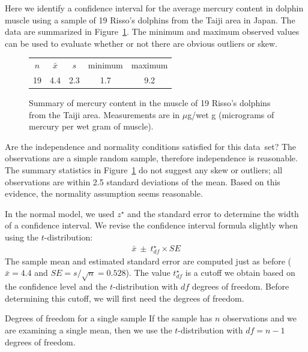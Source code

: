 Here we identify a confidence interval for the average mercury content in dolphin muscle using a sample of 19 Risso's dolphins from the Taiji area in Japan. The data are summarized in Figure~\ref{summaryStatsOfHgInMuscleOfRissosDolphins}. The minimum and maximum observed values can be used to evaluate whether or not there are obvious outliers or skew.

\begin{figure}[h]
\centering
\begin{tabular}{ccc cc}
\hline
$n$ & $\bar{x}$ & $s$ & minimum & maximum \\
19   & 4.4	  & 2.3  & 1.7	       & 9.2 \\
\hline
\end{tabular}
\caption{Summary of mercury content in the muscle of 19 Risso's dolphins from the Taiji area. Measurements are in $\mu$g/wet g (micrograms of mercury per wet gram of muscle).}
\label{summaryStatsOfHgInMuscleOfRissosDolphins}
\end{figure}

\begin{examplewrap}
\begin{nexample}{Are the independence and normality
    conditions satisfied for this data~set?}
  The observations are a simple random sample,
  therefore independence is reasonable.
  The summary statistics in
  Figure~\ref{summaryStatsOfHgInMuscleOfRissosDolphins}
  do not suggest any skew or outliers;
  all observations are within 2.5 standard deviations
  of the mean.
  Based on this evidence, the normality assumption
  seems reasonable.
\end{nexample}
\end{examplewrap}

In the normal model, we used $z^{\star}$ and the standard error to determine the width of a confidence interval. We revise the confidence interval formula slightly when using the $t$-distribution:
\begin{align*}
\bar{x} \ \pm\  t^{\star}_{df} \times SE
\end{align*}
The sample mean and estimated standard error are computed just as before ($\bar{x} = 4.4$ and $SE = s/\sqrt{n} = 0.528$). The value $t^{\star}_{df}$ is a cutoff we obtain based on the confidence level and the $t$-distribution with $df$ degrees of freedom. Before determining this cutoff, we will first need the degrees of freedom.

\begin{onebox}{Degrees of freedom for a single sample}
If the sample has $n$ observations and we are examining a single mean, then we use the $t$-distribution with $df=n-1$ degrees of freedom.
\end{onebox}

